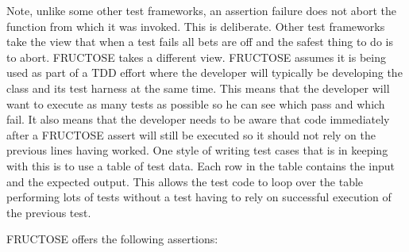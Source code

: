 \documentclass{book}
\begin{document}
Note, unlike some other test frameworks, an assertion failure does not
abort the function from which it was invoked.
This is deliberate. Other test frameworks take the view that when
a test fails all bets are off and the safest thing to do is to abort.
FRUCTOSE takes a different view. FRUCTOSE assumes it is being used as part
of a TDD effort where the developer will typically be developing the
class and its test harness at the same time. This means that the developer
will want to execute as many tests as possible so he can see which pass
and which fail. It also means that the developer needs to be aware
that code immediately after a FRUCTOSE assert will still be executed
so it should not rely on the previous lines having worked.
One style of writing test cases that is in keeping with this is to 
use a table of test data. Each row in the table contains the input and
the expected output. This allows the test code to loop over the table
performing lots of tests without a test having to rely on
successful execution of the previous test.

\hfil\break

FRUCTOSE offers the following assertions:
\end{document}
